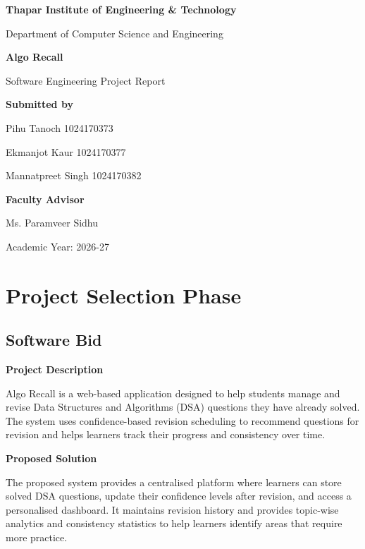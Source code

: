 \documentclass[12pt,a4paper]{report}
\newcommand{\UniversityName}{Thapar Institute of Engineering \& Technology}
\newcommand{\DepartmentName}{Department of Computer Science and Engineering}
\newcommand{\ProjectTitle}{Algo Recall}
\begin{document}
\begin{titlepage}
\centering
\vspace*{1cm}
{\Large\bfseries \UniversityName\par}
\vspace{0.5cm}
{\large \DepartmentName\par}
\vspace{2cm}
{\Huge\bfseries \ProjectTitle\par}
\vspace{0.5cm}
{\Large Software Engineering Project Report\par}
\vspace{2cm}
\textbf{Submitted by}\\[0.3cm]
{\large Pihu Tanoch  1024170373\par}
{\large Ekmanjot Kaur  1024170377\par}
{\large Mannatpreet Singh 1024170382\par}

\vspace{1.5cm}
\textbf{Faculty Advisor}\\[0.3cm]
{\large  Ms. Paramveer Sidhu\par}
\vfill
{\large Academic Year: 2026-27 \par}
\end{titlepage}

\tableofcontents
\clearpage
{}

\chapter{Project Selection Phase}
\section{Software Bid}
\textbf{Project Description}

Algo Recall is a web-based application designed to help students manage and revise Data Structures and Algorithms (DSA) questions they have already solved. The system uses confidence-based revision scheduling to recommend questions for revision and helps learners track their progress and consistency over time.

\textbf{Proposed Solution}

The proposed system provides a centralised platform where learners can store solved DSA questions, update their confidence levels after revision, and access a personalised dashboard. It maintains revision history and provides topic-wise analytics and consistency statistics to help learners identify areas that require more practice.
\end{document}
